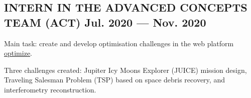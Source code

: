 \documentclass[letter,10pt]{article}
\begin{document}
\subsection{{INTERN IN THE ADVANCED CONCEPTS TEAM (ACT) \hfill Jul. 2020  --- Nov. 2020}}
\begin{zitemize}
\item Main task: create and develop optimisation challenges in the web platform \href{https://optimize.esa.int/}{optimize}.
\item Three challenges created: Jupiter Icy Moons Explorer (JUICE) mission design, Traveling Salesman Problem (TSP) based on space debris recovery, and interferometry reconstruction.
\end{zitemize}

\end{document}
